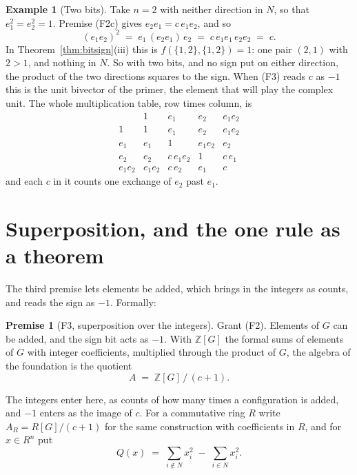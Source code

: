 \documentclass[11pt]{article}
\theoremstyle{plain}
\theoremstyle{definition}
\newtheorem{example}{Example}
\theoremstyle{plain}
\theoremstyle{definition}
\newtheorem*{premise}{Premise}
\newcommand{\Z}{\mathbb{Z}}
\begin{document}
\begin{example}[Two bits]\label{ex:twobits}
Take $n = 2$ with neither direction in $N$, so that $e_{1}^{2} = e_{2}^{2} = 1$. Premise (F2c) gives $e_{2}e_{1} = c\,e_{1}e_{2}$, and so
\[
(e_{1}e_{2})^{2} \;=\; e_{1}\,(e_{2}e_{1})\,e_{2} \;=\; c\,e_{1}e_{1}\,e_{2}e_{2} \;=\; c .
\]
In Theorem~\ref{thm:bitsign}(iii) this is $f(\{1,2\},\{1,2\}) = 1$: one pair $(2,1)$ with $2 > 1$, and nothing in $N$. So with two bits, and no sign put on either direction, the product of the two directions squares to the sign. When (F3) reads $c$ as $-1$ this is the unit bivector of the primer, the element that will play the complex unit. The whole multiplication table, row times column, is
\[
\begin{array}{c|cccc}
 & 1 & e_{1} & e_{2} & e_{1}e_{2} \\ \hline
1 & 1 & e_{1} & e_{2} & e_{1}e_{2} \\
e_{1} & e_{1} & 1 & e_{1}e_{2} & e_{2} \\
e_{2} & e_{2} & c\,e_{1}e_{2} & 1 & c\,e_{1} \\
e_{1}e_{2} & e_{1}e_{2} & c\,e_{2} & e_{1} & c
\end{array}
\]
and each $c$ in it counts one exchange of $e_{2}$ past $e_{1}$.
\end{example}


\section{Superposition, and the one rule as a theorem}\label{sec:superposition}

The third premise lets elements be added, which brings in the integers as counts, and reads the sign as $-1$. Formally:

\begin{premise}[F3, superposition over the integers]
Grant (F2). Elements of $G$ can be added, and the sign bit acts as $-1$. With $\Z[G]$ the formal sums of elements of $G$ with integer coefficients, multiplied through the product of $G$, the algebra of the foundation is the quotient
\[
A \;=\; \Z[G]\,/\,(c + 1) .
\]
\end{premise}

The integers enter here, as counts of how many times a configuration is added, and $-1$ enters as the image of $c$. For a commutative ring $R$ write $A_{R} = R[G]/(c+1)$ for the same construction with coefficients in $R$, and for $x \in R^{n}$ put
\[
Q(x) \;=\; \sum_{i \notin N} x_{i}^{2} \;-\; \sum_{i \in N} x_{i}^{2} .
\]
\end{document}
